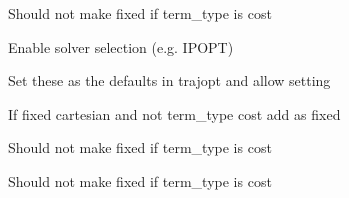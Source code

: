 \begin{DoxyRefList}
\label{todo__todo000034}%
%
Should not make fixed if term\+\_\+type is cost  
\item[Member \mbox{\hyperlink{classtesseract__planning_1_1TrajOptIfoptMotionPlanner_a8571318009fac584c15542ee8b2e4f04}{tesseract\+\_\+planning\+::Traj\+Opt\+Ifopt\+Motion\+Planner\+::solve}} (const \mbox{\hyperlink{structtesseract__planning_1_1PlannerRequest}{Planner\+Request}} \&request) const override]\label{todo__todo000030}%
%
Enable solver selection (e.\+g. IPOPT) 

\label{todo__todo000031}%
%
Set these as the defaults in trajopt and allow setting  
\item[Member \mbox{\hyperlink{classtesseract__planning_1_1TrajOptMotionPlanner_a6f42bc4743b8be6fd310b7e75282796d}{tesseract\+\_\+planning\+::Traj\+Opt\+Motion\+Planner\+::create\+Problem}} (const \mbox{\hyperlink{structtesseract__planning_1_1PlannerRequest}{Planner\+Request}} \&request) const]\label{todo__todo000027}%
%
If fixed cartesian and not term\+\_\+type cost add as fixed 

\label{todo__todo000028}%
%
Should not make fixed if term\+\_\+type is cost 

\label{todo__todo000029}%
%
Should not make fixed if term\+\_\+type is cost 
\end{DoxyRefList}